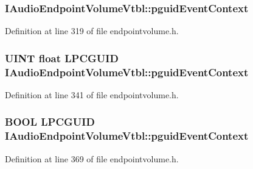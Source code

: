 \subsubsection[{\texorpdfstring{pguid\+Event\+Context}{pguidEventContext}}]{ I\+Audio\+Endpoint\+Volume\+Vtbl\+::pguid\+Event\+Context}\hypertarget{struct_i_audio_endpoint_volume_vtbl_a4645719eaa744e0ac977f788626cc4cc}{}\label{struct_i_audio_endpoint_volume_vtbl_a4645719eaa744e0ac977f788626cc4cc}


Definition at line 319 of file endpointvolume.\+h.

\subsubsection[{\texorpdfstring{pguid\+Event\+Context}{pguidEventContext}}]{ {\bf U\+I\+NT} float {\bf L\+P\+C\+G\+U\+ID} I\+Audio\+Endpoint\+Volume\+Vtbl\+::pguid\+Event\+Context}\hypertarget{struct_i_audio_endpoint_volume_vtbl_a8f34bfd07e5312310b58234ebcab8a47}{}\label{struct_i_audio_endpoint_volume_vtbl_a8f34bfd07e5312310b58234ebcab8a47}


Definition at line 341 of file endpointvolume.\+h.

\subsubsection[{\texorpdfstring{pguid\+Event\+Context}{pguidEventContext}}]{ {\bf B\+O\+OL} {\bf L\+P\+C\+G\+U\+ID} I\+Audio\+Endpoint\+Volume\+Vtbl\+::pguid\+Event\+Context}\hypertarget{struct_i_audio_endpoint_volume_vtbl_a92b929ed192c1adfc85c603a5c25d14b}{}\label{struct_i_audio_endpoint_volume_vtbl_a92b929ed192c1adfc85c603a5c25d14b}


Definition at line 369 of file endpointvolume.\+h.

